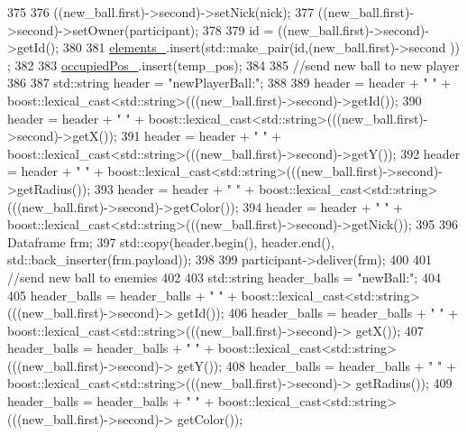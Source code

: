 \begin{DoxyCode}
375 
376         ((new\_ball.first)->second)->setNick(nick);
377         ((new\_ball.first)->second)->setOwner(participant);
378 
379         \textcolor{keywordtype}{id} = ((new\_ball.first)->second)->getId();
380 
381         \hyperlink{classwebsocket_1_1GameBoard_a56fd12d10af951e1f6a42a18f4ccfe35}{elements\_}.insert(std::make\_pair(\textcolor{keywordtype}{id},(new\_ball.first)->second )) ;       
382 
383         \hyperlink{classwebsocket_1_1GameBoard_aca1010defacfdd0ea5f032035ce7105e}{occupiedPos\_}.insert(temp\_pos);
384 
385         \textcolor{comment}{//send new ball to new player}
386 
387         std::string header = \textcolor{stringliteral}{"newPlayerBall:"};
388 
389         header = header + \textcolor{stringliteral}{" "} + boost::lexical\_cast<std::string>(((new\_ball.first)->second)->getId());
390         header = header + \textcolor{stringliteral}{" "} + boost::lexical\_cast<std::string>(((new\_ball.first)->second)->getX());
391         header = header + \textcolor{stringliteral}{" "} + boost::lexical\_cast<std::string>(((new\_ball.first)->second)->getY());
392         header = header + \textcolor{stringliteral}{" "} + boost::lexical\_cast<std::string>(((new\_ball.first)->second)->getRadius());
393         header = header + \textcolor{stringliteral}{" "} + boost::lexical\_cast<std::string>(((new\_ball.first)->second)->getColor());
394         header = header + \textcolor{stringliteral}{" "} + boost::lexical\_cast<std::string>(((new\_ball.first)->second)->getNick());
395 
396         Dataframe frm;
397         std::copy(header.begin(), header.end(), std::back\_inserter(frm.payload));
398 
399         participant->deliver(frm);
400 
401         \textcolor{comment}{//send new ball to enemies}
402 
403         std::string header\_balls = \textcolor{stringliteral}{"newBall:"};
404 
405         header\_balls = header\_balls + \textcolor{stringliteral}{" "} + boost::lexical\_cast<std::string>(((new\_ball.first)->second)->
      getId());
406         header\_balls = header\_balls + \textcolor{stringliteral}{" "} + boost::lexical\_cast<std::string>(((new\_ball.first)->second)->
      getX());
407         header\_balls = header\_balls + \textcolor{stringliteral}{" "} + boost::lexical\_cast<std::string>(((new\_ball.first)->second)->
      getY());
408         header\_balls = header\_balls + \textcolor{stringliteral}{" "} + boost::lexical\_cast<std::string>(((new\_ball.first)->second)->
      getRadius());
409         header\_balls = header\_balls + \textcolor{stringliteral}{" "} + boost::lexical\_cast<std::string>(((new\_ball.first)->second)->
      getColor());

\end{DoxyCode}
